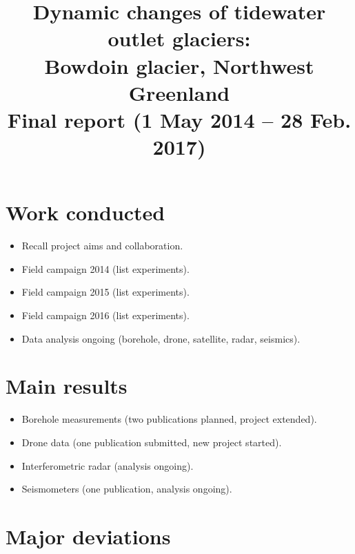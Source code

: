 \documentclass{article}
\title{Dynamic changes of tidewater outlet glaciers:\\
       Bowdoin glacier, Northwest Greenland\\\bigskip
       \large Final report (1 May 2014 -- 28 Feb. 2017)}
\author{}
\date{}
\begin{document}

\maketitle

\section{Work conducted}

\begin{itemize}
\item Recall project aims and collaboration.
\item Field campaign 2014 (list experiments).
\item Field campaign 2015 (list experiments).
\item Field campaign 2016 (list experiments).
\item Data analysis ongoing (borehole, drone, satellite, radar, seismics).
\end{itemize}

\section{Main results}

\begin{itemize}
\item Borehole measurements (two publications planned, project extended).
\item Drone data (one publication submitted, new project started).
\item Interferometric radar (analysis ongoing).
\item Seismometers (one publication, analysis ongoing).
\end{itemize}

\section{Major deviations}
\end{document}
